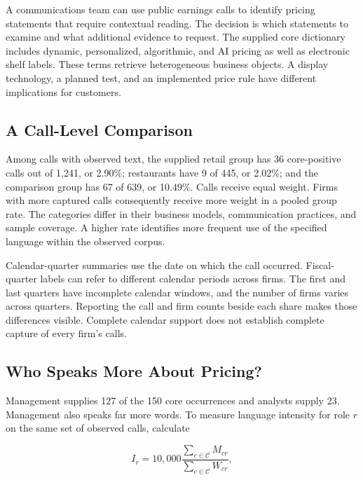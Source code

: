 \noindent \noindent A communications team can use public earnings calls to
identify pricing statements that require contextual reading. The
decision is which statements to examine and what additional evidence to
request. The supplied core dictionary includes dynamic, personalized,
algorithmic, and AI pricing as well as electronic shelf labels. These
terms retrieve heterogeneous business objects. A display technology, a
planned test, and an implemented price rule have different implications
for customers.

\hypertarget{M05-a-call-level-comparison}{%
\subsection{A Call-Level Comparison}\label{M05-a-call-level-comparison}}

\noindent \noindent Among calls with observed text, the supplied retail group has
36 core-positive calls out of 1,241, or 2.90\%; restaurants have 9 of
445, or 2.02\%; and the comparison group has 67 of 639, or 10.49\%.
Calls receive equal weight. Firms with more captured calls consequently
receive more weight in a pooled group rate. The categories differ in
their business models, communication practices, and sample coverage. A
higher rate identifies more frequent use of the specified language
within the observed corpus.

Calendar-quarter summaries use the date on which the call occurred.
Fiscal-quarter labels can refer to different calendar periods across
firms. The first and last quarters have incomplete calendar windows, and
the number of firms varies across quarters. Reporting the call and firm
counts beside each share makes those differences visible. Complete
calendar support does not establish complete capture of every firm's
calls.

\hypertarget{M05-who-speaks-more-about-pricing}{%
\subsection{Who Speaks More About
Pricing?}\label{M05-who-speaks-more-about-pricing}}

\noindent \noindent Management supplies 127 of the 150 core occurrences and
analysts supply 23. Management also speaks far more words. To measure
language intensity for role \(r\) on the same set of observed calls,
calculate

\[
I_r=10{,}000\frac{\sum_{c\in\mathcal C}M_{cr}}{\sum_{c\in\mathcal C}W_{cr}},
\]


